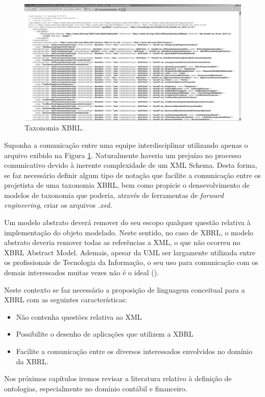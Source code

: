 \documentclass[msc,proposal,hidelot,hideabstract]{ppgccufmg} %
\begin{document}
\begin{figure}[hbtp]
\centering
\includegraphics[width=.75\textwidth]{img/arquivo_xsd.png}
\caption{Taxonomia XBRL.}
\label{fig:arquivo_xsd}
\end{figure}

Suponha a comunicação entre uma equipe interdisciplinar utilizando apenas o arquivo exibido na Figura \ref{fig:arquivo_xsd}. Naturalmente haveria um prejuízo no processo comunicativo devido à inerente complexidade de um XML Schema. Desta forma, se faz necessário definir algum tipo de notação que facilite a comunicação entre os projetista de uma taxonomia XBRL, bem como propicie o densevolvimento de modelos de taxonomia que poderia, através de ferramentas de \textit{forward engineering}, criar os arquivos \textit{.xsd}{}.

Um modelo abstrato deverá remover do seu escopo qualquer questão relativa à implementação do objeto modelado. Neste sentido, no caso de XBRL, o modelo abstrato deveria remover todas as referências a XML, o que não ocorreu no XBRL Abstract Model. Ademais, apesar da UML ser largamente utilizada entre os profissionais de Tecnologia da Informação, o seu uso para comunicação com os demais interessados muitas vezes não é o ideal (\cite{peixoto2008comparison}).

Neste contexto se faz necessário a proposição de linguagem conceitual para a XBRL com as seguintes características:
 \begin{itemize}
 	\item Não contenha questões relativa ao XML
 	\item Possibilite o desenho de aplicações que utilizem a XBRL
 	\item Facilite a comunicação entre os diversos interessados envolvidos no domínio da XBRL.
 \end{itemize}
 
Nos próximos capítulos iremos revisar a literatura relativo à definição de ontologias, especialmente no domínio contábil e financeiro.
\end{document}
